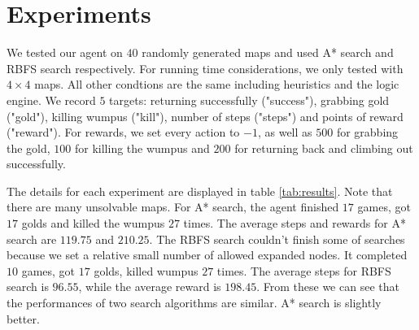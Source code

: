 \section{Experiments}\label{sec:exp}
We tested our agent on $40$ randomly generated maps and used A* search and RBFS search respectively. For running time considerations, we only tested with $4 \times 4$ maps. All other condtions are the same including heuristics and the logic engine. We record $5$ targets: returning successfully ("success"), grabbing gold ("gold"), killing wumpus ("kill"), number of steps ("steps") and points of reward ("reward"). For rewards, we set every action to $-1$,  as well as $500$ for grabbing the gold, $100$ for killing the wumpus and $200$ for returning back and climbing out successfully.

The details for each experiment are displayed in table \ref{tab:results}. Note that there are many unsolvable maps. For A* search, the agent finished $17$ games, got $17$ golds and killed the wumpus $27$ times. The average steps and rewards for A* search are $119.75$ and $210.25$. The RBFS search couldn't finish some of searches because we set a relative small number of allowed expanded nodes. It completed $10$ games, got $17$ golds, killed wumpus $27$ times. The average steps for RBFS search is $96.55$, while the average reward is $198.45$. From these we can see that the performances of two search algorithms are similar. A* search is slightly better.

